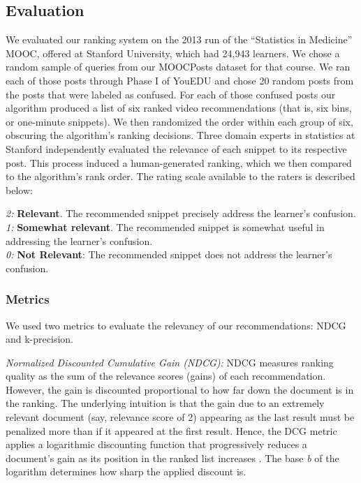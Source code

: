 \documentclass{edm_template}
\begin{document}
\subsection{Evaluation}

We evaluated our ranking system on the 2013 run of the ``Statistics in
Medicine'' MOOC, offered at Stanford University, which had 24,943
learners. We chose a random sample of queries from our MOOCPosts
dataset for that course. We ran each of those posts through Phase I of
YouEDU and chose 20 random posts from the posts that were labeled as
confused. For each of those confused posts our algorithm produced a
list of six ranked video recommendations (that is, six bins, or
one-minute snippets). We then randomized the order within each group
of six, obscuring the algorithm's ranking decisions. Three domain
experts in statistics at Stanford independently evaluated the
relevance of each snippet to its respective post. This process induced
a human-generated ranking, which we then compared to the algorithm's
rank order. The rating scale available to the raters is described
below:

\textit{2:} {\bf Relevant}. The recommended snippet precisely address the learner's confusion.\\
\textit{1:} {\bf Somewhat relevant}. The recommended snippet is somewhat useful in addressing the learner's confusion.\\
\textit{0:} {\bf Not Relevant}: The recommended snippet does not address the learner's confusion.
\vspace{-0.3cm}
\subsubsection{Metrics}
We used two metrics to evaluate the relevancy of our recommendations: NDCG and k-precision.

\textit{Normalized Discounted Cumulative Gain (NDCG):}
NDCG measures ranking quality as the sum of the relevance scores (gains) of each recommendation. However, the gain is discounted proportional to how far down the document is in the ranking. The underlying intuition is that the gain due to an extremely relevant document (say, relevance score of 2) appearing as the last result must be penalized more than if it appeared at the first result. Hence, the DCG metric applies a logarithmic discounting function that progressively reduces a document's gain as its position in the ranked list increases \cite{ndcgcite}. The base \textit{b} of the logarithm determines how sharp the applied discount is.
\end{document}
